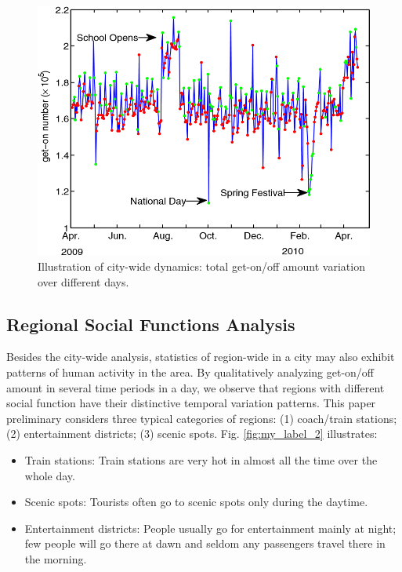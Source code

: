 \documentclass[a4paper, 10pt, conference]{ieeeconf}      %
\begin{document}
\begin{figure}[ht]
    \centering
    \includegraphics{fig/f1.png}
    \caption{Illustration of city-wide dynamics: total get-on/off amount variation over different days.}
    \label{fig:my_label_1}
\end{figure}

\subsection{Regional Social Functions Analysis}Besides the city-wide analysis, statistics of region-wide in a city may also exhibit patterns of human activity in the area. By qualitatively analyzing get-on/off amount in several time periods in a day, we observe that regions with different social function have their distinctive temporal variation patterns.
This paper preliminary considers three typical categories of regions: (1) coach/train stations; (2) entertainment districts; (3) scenic spots. Fig. \ref{fig:my_label_2} illustrates:

\begin{itemize}

\item Train stations: Train stations are very hot in almost all the time over the whole day.
\item Scenic spots: Tourists often go to scenic spots only during the daytime.
\item Entertainment districts: People usually go for entertainment mainly at night; few people will go there at dawn and seldom any passengers travel there in the morning.

\end{itemize}
\end{document}
